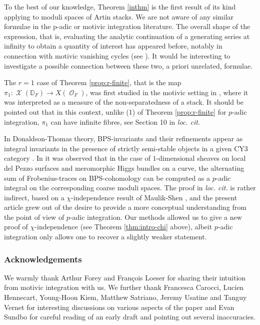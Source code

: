 \documentclass{article}
\DeclareMathOperator{\Xc}{\mathcal{X}}
\DeclareMathOperator{\Oc}{\mathcal{O}}
\theoremstyle{definition}
\theoremstyle{plain}
\begin{document}
To the best of our knowledge, Theorem \ref{inthm} is the first result of its kind applying to moduli spaces of Artin stacks. We are not aware of any similar formulae in the p-adic or motivic integration literature. The overall shape of the expression, that is, evaluating the analytic continuation of a generating series at infinity to obtain a quantity of interest has appeared before, notably in connection with motivic vanishing cycles (see \cite{DL98,HL15}). It would be interesting to investigate a possible connection between these two, a priori unrelated, formulae.

The $r=1$ case of Theorem \ref{prop:r-finite}, that is the map $\pi_1\colon \Xc(\mathbb{D}_F) \to X(\Oc_F)$, was first studied in the motivic setting in \cite{SU22}, where it was interpreted as a measure of the non-separatedness of a stack. It should be pointed out that in this context, unlike (1) of Theorem \ref{prop:r-finite} for $p$-adic integration, $\pi_1$ can have infinite fibres, see Section 10 in \textit{loc. cit}. %

In Donaldson-Thomas theory, BPS-invariants and their refinements appear as integral invariants in the presence of strictly semi-stable objects in a given CY3 category \cite{JS12, KS08}. In \cite{COW21} it was observed that in the case of $1$-dimensional sheaves on local del Pezzo surfaces and meromorphic Higgs bundles on a curve, the alternating sum of Frobenius-traces on BPS-cohomology can be computed as a $p$-adic integral on the corresponding coarse moduli spaces. The proof in \textit{loc. cit.} is rather indirect, based on a $\chi$-independence result of Maulik-Shen \cite{MS20}, and the present article grew out of the desire to provide a more conceptual understanding from the point of view of $p$-adic integration. Our methods allowed us to give a new proof of $\chi$-independence (see Theorem \ref{thm:intro-chi} above), albeit $p$-adic integration only allows one to recover a slightly weaker statement.

\subsubsection*{Acknowledgements} We warmly thank Arthur Forey and François Loeser for sharing their intuition from motivic integration with us. We further thank Francesca Carocci, Lucien Hennecart, Young-Hoon Kiem, Matthew Satriano, Jeremy Usatine and Tanguy Vernet for interesting discussions on various aspects of the paper and Evan Sundbo for careful reading of an early draft and pointing out several inaccuracies.
\end{document}
